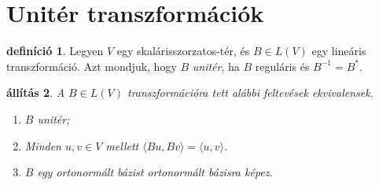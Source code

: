 \documentclass[9pt, a4paper, showtrims]{memoir}
\theoremstyle{plain}
\newtheorem{proposition}{állítás}[chapter]
\theoremstyle{remark}
\theoremstyle{definition}
\newtheorem{definition}[proposition]{definíció}
\newcommand{\ip}[2]{\langle#1,#2\rangle}
\begin{document}
\section{Unitér transzformációk}
\begin{definition}
    Legyen $V$ egy skalárisszorzatos-tér, és $B\in L\left( V \right)$ egy lineáris transzformáció.
    Azt mondjuk, hogy $B$
    \emph{unitér},
    ha $B$ reguláris és $B^{-1}=B^\ast$.
\end{definition}
\begin{proposition}
    A $B\in L\left( V \right)$ transzformációra tett alábbi feltevések ekvivalensek.
    \begin{enumerate}
        \item $B$ unitér;
        \item Minden $u,v\in V$ mellett $\ip{Bu}{Bv}=\ip{u}{v}$.
        \item $B$ egy ortonormált bázist ortonormált bázisra képez.
            \qedhere
    \end{enumerate}
\end{proposition}
\end{document}
